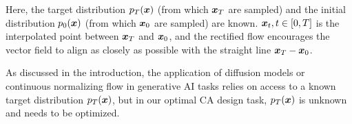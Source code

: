 Here, the target distribution $p_T({\bm{x}})$ (from which ${\bm{x}}_T$ are sampled) and the initial distribution $p_0({\bm{x}})$ (from which ${\bm{x}}_0$ are sampled) are known. ${\bm{x}}_t,t\in[0,T]$ is the interpolated point between ${\bm{x}}_T$ and ${\bm{x}}_0$, and the rectified flow encourages the vector field to align as closely as possible with the straight line ${\bm{x}}_T-{\bm{x}}_0$.

As discussed in the introduction, the application of diffusion models or continuous normalizing flow in generative AI tasks relies on access to a known target distribution $p_T({\bm{x}})$, but in our optimal CA design task, $p_T({\bm{x}})$ is unknown and needs to be optimized. 



%
